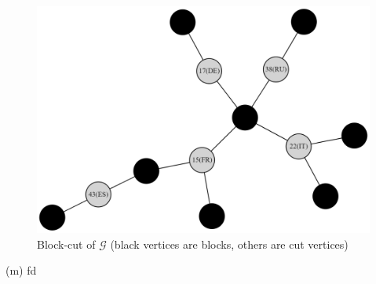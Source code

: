 \documentclass{article}
\begin{document}
\begin{figure}[h]
	\centering
	\includegraphics[width=1\textwidth]{block cut tree.png}
	\caption{Block-cut of $\mathcal{G}$ (black vertices are blocks, others are cut vertices)}
\end{figure}\newpage
	(m) fd
\end{document}
